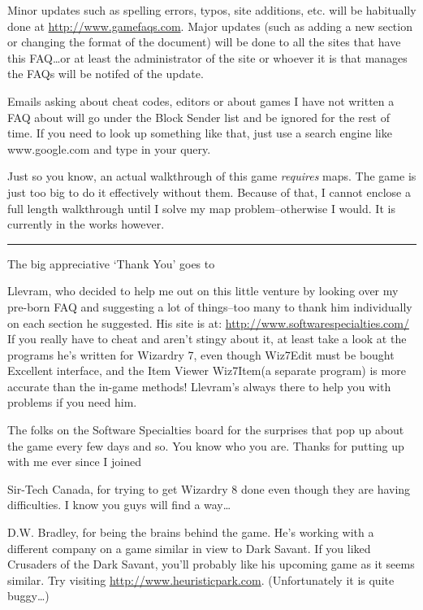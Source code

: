 \documentclass[12pt]{article}
\begin{document}
Minor updates such as spelling errors, typos, site additions, etc. will
be habitually done at \url{http://www.gamefaqs.com}. Major updates (such
as adding a new section or changing the format of the document) will be
done to all the sites that have this FAQ\ldots{}or at least the
administrator of the site or whoever it is that manages the FAQs will be
notifed of the update.

Emails asking about cheat codes, editors or about games I have not
written a FAQ about will go under the Block Sender list and be ignored
for the rest of time. If you need to look up something like that, just
use a search engine like www.google.com and type in your query.

Just so you know, an actual walkthrough of this game \emph{requires}
maps. The game is just too big to do it effectively without them.
Because of that, I cannot enclose a full length walkthrough until I
solve my map problem--otherwise I would. It is currently in the works
however.

\begin{center}\rule{0.5\linewidth}{\linethickness}\end{center}

The big appreciative `Thank You' goes to

Llevram, who decided to help me out on this little venture by looking
over my pre-born FAQ and suggesting a lot of things--too many to thank
him individually on each section he suggested. His site is at:
\url{http://www.softwarespecialties.com/} If you really have to cheat
and aren't stingy about it, at least take a look at the programs he's
written for Wizardry 7, even though Wiz7Edit must be bought Excellent
interface, and the Item Viewer Wiz7Item(a separate program) is more
accurate than the in-game methods! Llevram's always there to help you
with problems if you need him.

The folks on the Software Specialties board for the surprises that pop
up about the game every few days and so. You know who you are. Thanks
for putting up with me ever since I joined

Sir-Tech Canada, for trying to get Wizardry 8 done even though they are
having difficulties. I know you guys will find a way\ldots{}

D.W. Bradley, for being the brains behind the game. He's working with a
different company on a game similar in view to Dark Savant. If you liked
Crusaders of the Dark Savant, you'll probably like his upcoming game as
it seems similar. Try visiting \url{http://www.heuristicpark.com}.
(Unfortunately it is quite buggy\ldots{})
\end{document}
